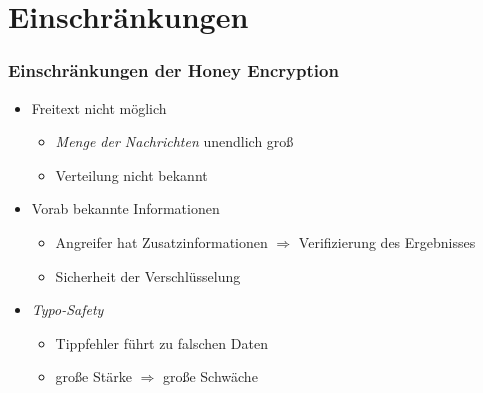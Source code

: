 \section{Einschränkungen}

\begin{frame}[t]
	\frametitle{Einschränkungen der Honey Encryption}
	
	\begin{itemize}
		\item Freitext nicht möglich
		\begin{itemize}
			\item \emph{Menge der Nachrichten} unendlich groß
			\item Verteilung nicht bekannt
		\end{itemize}
		\pause
		\item Vorab bekannte Informationen
		\begin{itemize}
			\item Angreifer hat Zusatzinformationen $\Rightarrow$ Verifizierung des Ergebnisses
			\item Sicherheit der Verschlüsselung
		\end{itemize}
		\pause
		\item \emph{Typo-Safety}
		\begin{itemize}
			\item Tippfehler führt zu falschen Daten
			\item große Stärke $\Rightarrow$ große Schwäche
		\end{itemize}
	\end{itemize}	
	
\end{frame}